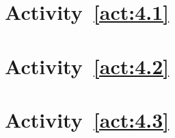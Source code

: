 \section{Activity~\ref{act:4.1}}



\section{Activity~\ref{act:4.2}}



\section{Activity~\ref{act:4.3}}


